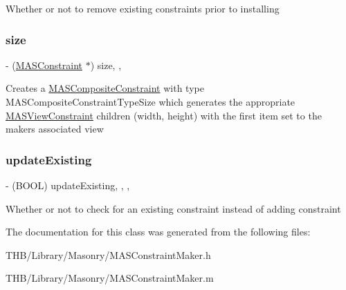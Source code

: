 Whether or not to remove existing constraints prior to installing \mbox{\label{interface_m_a_s_constraint_maker_a0ef127bf03a502b0e79b2ace44e4adac}} 
\subsubsection{\texorpdfstring{size}{size}}
{\footnotesize\ttfamily -\/ (\mbox{\hyperlink{interface_m_a_s_constraint}{M\+A\+S\+Constraint}} $\ast$) size\hspace{0.3cm}{\ttfamily [read]}, {\ttfamily [nonatomic]}, {\ttfamily [strong]}}

Creates a \mbox{\hyperlink{interface_m_a_s_composite_constraint}{M\+A\+S\+Composite\+Constraint}} with type M\+A\+S\+Composite\+Constraint\+Type\+Size which generates the appropriate \mbox{\hyperlink{interface_m_a_s_view_constraint}{M\+A\+S\+View\+Constraint}} children (width, height) with the first item set to the makers associated view \mbox{\label{interface_m_a_s_constraint_maker_ae2b84a526dbef016eb4cecccf7efe98d}} 
\subsubsection{\texorpdfstring{update\+Existing}{updateExisting}}
{\footnotesize\ttfamily -\/ (B\+O\+OL) update\+Existing\hspace{0.3cm}{\ttfamily [read]}, {\ttfamily [write]}, {\ttfamily [nonatomic]}, {\ttfamily [assign]}}

Whether or not to check for an existing constraint instead of adding constraint 

The documentation for this class was generated from the following files\+:\begin{DoxyCompactItemize}
\item 
T\+H\+B/\+Library/\+Masonry/M\+A\+S\+Constraint\+Maker.\+h\item 
T\+H\+B/\+Library/\+Masonry/M\+A\+S\+Constraint\+Maker.\+m\end{DoxyCompactItemize}
